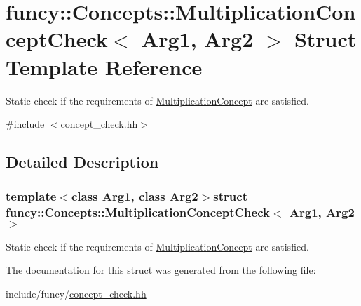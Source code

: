 \hypertarget{structfuncy_1_1Concepts_1_1MultiplicationConceptCheck}{\section{funcy\-:\-:Concepts\-:\-:Multiplication\-Concept\-Check$<$ Arg1, Arg2 $>$ Struct Template Reference}
\label{structfuncy_1_1Concepts_1_1MultiplicationConceptCheck}
}


Static check if the requirements of \hyperlink{structfuncy_1_1Concepts_1_1MultiplicationConcept}{Multiplication\-Concept} are satisfied.  




{\ttfamily \#include $<$concept\-\_\-check.\-hh$>$}



\subsection{Detailed Description}
\subsubsection*{template$<$class Arg1, class Arg2$>$struct funcy\-::\-Concepts\-::\-Multiplication\-Concept\-Check$<$ Arg1, Arg2 $>$}

Static check if the requirements of \hyperlink{structfuncy_1_1Concepts_1_1MultiplicationConcept}{Multiplication\-Concept} are satisfied. 

The documentation for this struct was generated from the following file\-:\begin{DoxyCompactItemize}
\item 
include/funcy/\hyperlink{concept__check_8hh}{concept\-\_\-check.\-hh}\end{DoxyCompactItemize}
